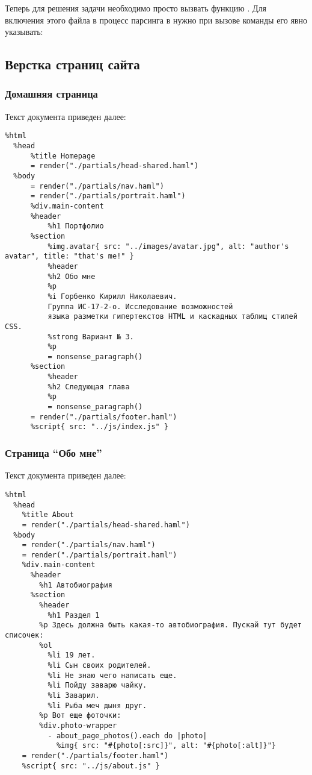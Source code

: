 \documentclass[a4paper,14pt]{extarticle}
\begin{document}
Теперь для решения задачи необходимо просто вызвать функцию .
Для включения этого файла в процесс парсинга  в 
нужно при вызове команды его явно указывать:


\subsection{Верстка страниц сайта}

\subsubsection{Домашняя страница}
Текст документа  приведен далее:
\begin{lstlisting}
%html
  %head
      %title Homepage
      = render("./partials/head-shared.haml")
  %body
      = render("./partials/nav.haml")
      = render("./partials/portrait.haml")
      %div.main-content
      %header
          %h1 Портфолио
      %section
          %img.avatar{ src: "../images/avatar.jpg", alt: "author's avatar", title: "that's me!" }
          %header
          %h2 Обо мне
          %p
          %i Горбенко Кирилл Николаевич.
          Группа ИС-17-2-о. Исследование возможностей
          языка разметки гипертекстов HTML и каскадных таблиц стилей CSS.
          %strong Вариант № 3.
          %p
          = nonsense_paragraph()
      %section
          %header
          %h2 Следующая глава
          %p
          = nonsense_paragraph()
      = render("./partials/footer.haml")
      %script{ src: "../js/index.js" }
\end{lstlisting}

\subsubsection{Страница \enquote{Обо мне}}
Текст документа  приведен далее:
\begin{lstlisting}
%html
  %head
    %title About
    = render("./partials/head-shared.haml")
  %body
    = render("./partials/nav.haml")
    = render("./partials/portrait.haml")
    %div.main-content
      %header
        %h1 Автобиография
      %section
        %header
          %h1 Раздел 1
        %p Здесь должна быть какая-то автобиография. Пускай тут будет списочек:
        %ol
          %li 19 лет.
          %li Сын своих родителей.
          %li Не знаю чего написать еще.
          %li Пойду заварю чайку.
          %li Заварил.
          %li Рыба меч дыня друг.
        %p Вот еще фоточки:
        %div.photo-wrapper
          - about_page_photos().each do |photo|
            %img{ src: "#{photo[:src]}", alt: "#{photo[:alt]}"}
    = render("./partials/footer.haml")
    %script{ src: "../js/about.js" }
\end{lstlisting}
\end{document}
